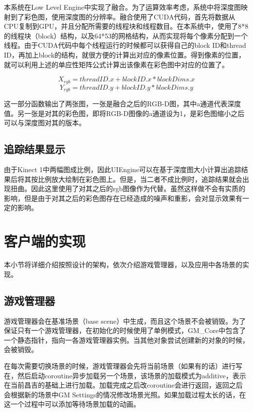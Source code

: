 本系统在Low Level Engine中实现了融合。为了运算效率考虑，系统中将深度图映射到了彩色图，使用深度图的分辨率。融合使用了CUDA代码，首先将数据从CPU复制到GPU，并且分配所需要的线程块和线程数目。在本系统中，使用了8*8的线程块（block）结构，以及64*53的网格结构，从而实现将每个像素分配到一个线程。由于CUDA代码中每个线程运行的时候都可以获得自己的block ID和thread ID，再加上block的结构，就很方便的计算出对应的像素位置。得到像素的位置，就可以利用上述的单应性矩阵公式计算出该像素在彩色图中对应的位置了。
	
\begin{equation}
 X_{rgb} = threadID.x + blockID.x * blockDims.x
\end{equation}
\begin{equation}
 Y_{rgb} = threadID.y + blockID.y * blockDims.y
\end{equation}

这一部分函数输出了两张图，一张是融合之后的RGB-D图，其中a通道代表深度值。另一张是对其的彩色图，即将RGB-D图像的a通道设为1，是彩色图缩小之后可以与深度图对其的版本。

\subsection{追踪结果显示}

由于Kinect 1中两幅图成比例，因此UIEngine可以在基于深度图大小计算出追踪结果后将其按比例放大绘制在彩色图上。但是，当二者不成比例时，追踪结果就会出现扭曲。因此这里使用了对其之后的rgb图像作为代替。虽然这样做不会有实质的影响，但是由于对其之后的彩色图存在已经造成的噪声和重影，会对显示效果有一定的影响。

\section{客户端的实现}
本小节将详细介绍按照设计的架构，依次介绍游戏管理器，以及应用中各场景的实现。

\subsection{游戏管理器}
游戏管理器会在基准场景（base scene）中生成，而且这个场景不会被销毁。为了保证只有一个游戏管理器，在初始化的时候使用了单例模式，GM\_Core中包含了一个静态指针，指向一各游戏管理器实例。当其他对象尝试创建新的对象的时候，会被销毁。

在每次需要切换场景的时候，游戏管理器会先将当前场景（如果有的话）进行写在，然后启动coroutine异步加载另一个场景，该场景的加载模式为additive，表示在当前昌吉的基础上进行加载。加载完成之后改coroutine会进行返回，返回之后会根据新的场景中GM Settings的情况修改场景光照。如果加载过程太长的话，在这一个过程中可以添加等待场景加载的动画。

